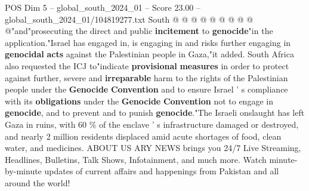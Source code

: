 \begin{textsample}{POS Dim 5 – global\_south\_2024\_01 – Score 23.00 – global\_south\_2024\_01/104819277.txt}
South @ @ @ @ @ @ @ @ @ @"and"prosecuting the direct and public \textbf{incitement} to \textbf{genocide}"in the application."Israel has engaged in, is engaging in and risks further engaging in \textbf{genocidal} \textbf{acts} against the Palestinian people in Gaza,"it added.
South Africa also requested the ICJ to"indicate \textbf{provisional} \textbf{measures} in order to protect against further, severe and \textbf{irreparable} harm to the rights of the Palestinian people under the \textbf{Genocide} \textbf{Convention} and to ensure Israel ' s compliance with its \textbf{obligations} under the \textbf{Genocide} \textbf{Convention} not to engage in \textbf{genocide}, and to prevent and to punish \textbf{genocide}."The Israeli onslaught has left Gaza in ruins, with 60 \% of the enclave ' s infrastructure damaged or destroyed, and nearly 2 million residents displaced amid acute shortages of food, clean water, and medicines.
ABOUT US ARY NEWS brings you 24/7 Live Streaming, Headlines, Bulletins, Talk Shows, Infotainment, and much more.
Watch minute-by-minute updates of current affairs and happenings from Pakistan and all around the world!

\end{textsample}
